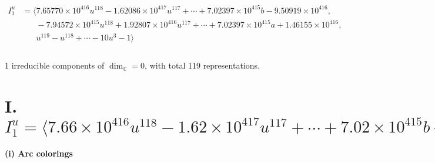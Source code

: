 \documentclass[1p]{elsarticle_modified}
\theoremstyle{definition}
\begin{document}
\begin{align*}
I^u_{1}&=\langle 
7.65770\times10^{416} u^{118}-1.62086\times10^{417} u^{117}+\cdots+7.02397\times10^{415} b-9.50919\times10^{416},\\
\phantom{I^u_{1}}&\phantom{= \langle  }-7.94572\times10^{415} u^{118}+1.92807\times10^{416} u^{117}+\cdots+7.02397\times10^{415} a+1.46155\times10^{416},\\
\phantom{I^u_{1}}&\phantom{= \langle  }u^{119}- u^{118}+\cdots-10 u^3-1\rangle \\
\\
\end{align*}
\raggedright * 1 irreducible components of $\dim_{\mathbb{C}}=0$, with total 119 representations.\\
\newpage
\renewcommand{\arraystretch}{1}
\centering \section*{I. $I^u_{1}= \langle 7.66\times10^{416} u^{118}-1.62\times10^{417} u^{117}+\cdots+7.02\times10^{415} b-9.51\times10^{416},\;-7.95\times10^{415} u^{118}+1.93\times10^{416} u^{117}+\cdots+7.02\times10^{415} a+1.46\times10^{416},\;u^{119}- u^{118}+\cdots-10 u^3-1 \rangle$}
\flushleft \textbf{(i) Arc colorings}\\
\end{document}

